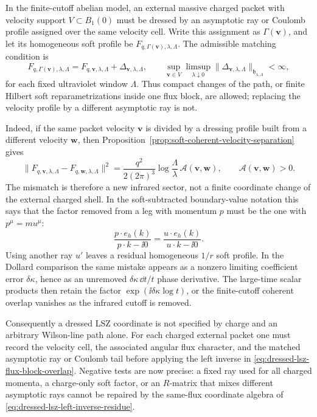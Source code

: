 \begin{controlledapproximation}
\label{ca:charged-ray-velocity-matching}
In the finite-cutoff abelian model, an external massive charged packet with
velocity support \(V\subset B_1(0)\) must be dressed by an asymptotic ray or
Coulomb profile assigned over the same velocity cell.  Write this assignment
as \(\Gamma(\mathbf v)\), and let its homogeneous soft profile be
\(F_{q,\Gamma(\mathbf v),\lambda,\Lambda}\).  The admissible matching
condition is
\[
  F_{q,\Gamma(\mathbf v),\lambda,\Lambda}
  =
  F_{q,\mathbf v,\lambda,\Lambda}
  +
  \Delta_{\mathbf v,\lambda,\Lambda},
  \qquad
  \sup_{\mathbf v\in V}
  \limsup_{\lambda\downarrow0}
  \|\Delta_{\mathbf v,\lambda,\Lambda}\|_{\mathfrak h_{\lambda,\Lambda}}
  <\infty ,
\]
for each fixed ultraviolet window \(\Lambda\).  Thus compact changes of the
path, or finite Hilbert soft reparametrizations inside one flux block, are
allowed; replacing the velocity profile by a different asymptotic ray is not.

Indeed, if the same packet velocity \(\mathbf v\) is divided by a dressing
profile built from a different velocity \(\mathbf w\), then
Proposition~\ref{prop:soft-coherent-velocity-separation} gives
\[
  \|F_{q,\mathbf v,\lambda,\Lambda}
     -F_{q,\mathbf w,\lambda,\Lambda}\|^2
  =
  \frac{q^2}{2(2\pi)^3}
  \log\frac{\Lambda}{\lambda}\,
  \mathcal A(\mathbf v,\mathbf w),
  \qquad
  \mathcal A(\mathbf v,\mathbf w)>0 .
\]
The mismatch is therefore a new infrared sector, not a finite coordinate
change of the external charged shell.  In the soft-subtracted boundary-value
notation this says that the factor removed from a leg with momentum \(p\)
must be the one with \(p^\mu=m u^\mu\):
\[
  \frac{p\cdot e_h(k)}{p\cdot k-\ii0}
  =
  \frac{u\cdot e_h(k)}{u\cdot k-\ii0}.
\]
Using another ray \(u'\) leaves a residual homogeneous \(1/r\) soft profile.
In the Dollard comparison the same mistake appears as a nonzero limiting
coefficient error \(\delta\kappa\), hence as an unremoved
\(\delta\kappa\,\dd t/t\) phase derivative.  The large-time scalar products
then retain the factor \(\exp(\ii\delta\kappa\log t)\), or the finite-cutoff
coherent overlap vanishes as the infrared cutoff is removed.

Consequently a dressed LSZ coordinate is not specified by charge and an
arbitrary Wilson-line path alone.  For each charged external packet one must
record the velocity cell, the associated angular flux character, and the
matched asymptotic ray or Coulomb tail before applying the left inverse in
\eqref{eq:dressed-lsz-flux-block-overlap}.  Negative tests are now precise:
a fixed ray used for all charged momenta, a charge-only soft factor, or an
\(R\)-matrix that mixes different asymptotic rays cannot be repaired by the
same-flux coordinate algebra of \eqref{eq:dressed-lsz-left-inverse-residue}.
\end{controlledapproximation}

